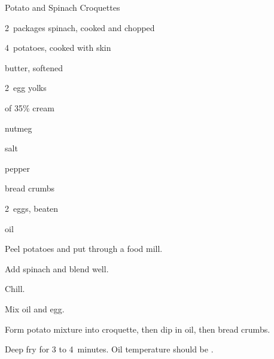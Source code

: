 \begin{recipe}{Potato and Spinach Croquettes}{}{}

\begin{ingredients}
\item 2~packages spinach, cooked and chopped
\item 4~potatoes, cooked with skin
\item {} butter, softened
\item 2~egg yolks
\item {} of 35\% cream
\item \tp{\half} nutmeg
\item salt
\item pepper
\item {} bread crumbs
\item 2~eggs, beaten
\item {} oil
\end{ingredients}

\begin{directions}
\item Peel potatoes and put through a food mill.
\item Add spinach and blend well.
\item Chill.
\item Mix oil and egg.
\item Form potato mixture into croquette, then dip in oil, then bread crumbs.
\item Deep fry for 3 to 4~minutes. Oil temperature should be .
\end{directions}

\end{recipe}
